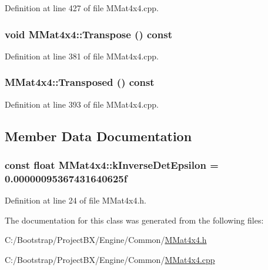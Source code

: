 Definition at line 427 of file MMat4x4.cpp.\hypertarget{class_m_mat4x4_d0f028021424a3132bd7eda119094b94}{
\subsubsection[{Transpose}]{\setlength{\rightskip}{0pt plus 5cm}void MMat4x4::Transpose () const}}
\label{class_m_mat4x4_d0f028021424a3132bd7eda119094b94}




Definition at line 381 of file MMat4x4.cpp.\hypertarget{class_m_mat4x4_6015f2e4f21155e99a953cb768a408b6}{
\subsubsection[{Transposed}]{ MMat4x4::Transposed () const}}
\label{class_m_mat4x4_6015f2e4f21155e99a953cb768a408b6}




Definition at line 393 of file MMat4x4.cpp.

\subsection{Member Data Documentation}
\hypertarget{class_m_mat4x4_f023d028712e837f5150cfa1cffec3ad}{
\subsubsection[{kInverseDetEpsilon}]{\setlength{\rightskip}{0pt plus 5cm}const float {\bf MMat4x4::kInverseDetEpsilon} = 0.00000095367431640625f}}
\label{class_m_mat4x4_f023d028712e837f5150cfa1cffec3ad}




Definition at line 24 of file MMat4x4.h.

The documentation for this class was generated from the following files:\begin{CompactItemize}
\item 
C:/Bootstrap/ProjectBX/Engine/Common/\hyperlink{_m_mat4x4_8h}{MMat4x4.h}\item 
C:/Bootstrap/ProjectBX/Engine/Common/\hyperlink{_m_mat4x4_8cpp}{MMat4x4.cpp}\end{CompactItemize}
